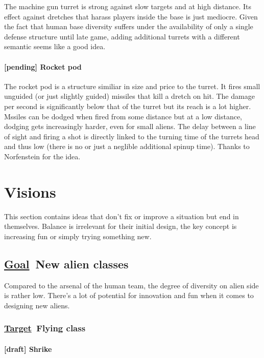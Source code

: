 \documentclass{scrartcl}
\newcommand{\goal}     [0]{\textbf{\underline{Goal}\ }}
\newcommand{\target}   [0]{\textbf{\underline{Target}\ }}
\newcommand{\draft}    [0]{\textcolor{draft}    {\textbf{[draft] }}}
\newcommand{\pending}  [0]{\textcolor{pending}  {\textbf{[pending] }}}
\begin{document}
The machine gun turret is strong against slow targets and at high distance. Its effect against dretches that harass players inside the base is just mediocre. Given the fact that human base diversity suffers under the availability of only a single defense structure until late game, adding additional turrets with a different semantic seems like a good idea.

\paragraph{\pending Rocket pod}

The rocket pod is a structure similiar in size and price to the turret. It fires small unguided (or just slightly guided) missiles that kill a dretch on hit. The damage per second is significantly below that of the turret but its reach is a lot higher. Mssiles can be dodged when fired from some distance but at a low distance, dodging gets increasingly harder, even for small aliens. The delay between a line of sight and firing a shot is directly linked to the turning time of the turrets head and thus low (there is no or just a neglible additional spinup time). Thanks to Norfenstein for the idea.

\section{Visions}

This section contains ideas that don't fix or improve a situation but end in themselves. Balance is irrelevant for their initial design, the key concept is increasing fun or simply trying something new.

\subsection{\goal New alien classes}

Compared to the arsenal of the human team, the degree of diversity on alien side is rather low. There's a lot of potential for innovation and fun when it comes to designing new aliens.

\subsubsection{\target Flying class}

\paragraph{\draft Shrike}
\label{vulture}
\end{document}
